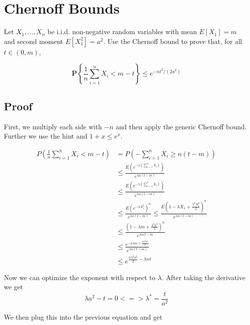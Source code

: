 \documentclass[a4paper, 11pt]{article} %
\begin{document}
\newpage

\section{Chernoff Bounds}
Let $X_1, . . . , X_n$ be i.i.d. non-negative random variables with mean $E[X_1] = m$ and
second moment $E[X_1^2] = a^2$. Use the Chernoff bound to prove that, for all $t \in (0, m)$,

\begin{equation*}
\mathbf { P } \left\{ \frac { 1 } { n } \sum _ { i = 1 } ^ { n } X _ { i } < m - t \right\} \leq e ^ { - n t ^ { 2 } / \left( 2 a ^ { 2 } \right) }
\end{equation*}

\subsection{Proof}

First, we multiply each side with $-n$ and then apply the generic Chernoff bound. Further we use the hint and $1+x \leq e^x$.

\begin{align*}
P \left( \frac { 1 } { n } \sum _ { i = 1 } ^ { n } X _ { i } < m - t \right) &= P \left( - \sum _ { i = 1 } ^ { n } X _ { i } \geq n ( t - m ) \right) \\
&\leq \frac{E \left( e ^{-\lambda \left(\sum_{i=1}^n X_i \right) } \right)}{e^{\lambda n(t-m)}} \\
&\leq \frac{E \left( e ^{-\lambda \left(\sum_{i=1}^n X_i \right) } \right)}{e^{\lambda n(t-m)}} \\
&\leq \frac{E \left( e ^{-\lambda X_1^2 } \right)^n}{e^{\lambda n(t-m)}} 
\leq  \frac{E \left( 1 - \lambda X_1 + \frac{\lambda^2 X_i^2}{2}   \right)^n}{e^{\lambda n(t-m)}} \\
&\leq \frac{ \left(1 - \lambda m + \frac{\lambda^2 a^2}{2} \right)^n  }{e^{\lambda n(t-m}} \\
&\leq \frac{e^{- n\lambda m + \frac{n\lambda^2 a^2}{2} }}{e^{\lambda n(t-m)}} \\
&\leq e^{\frac{n \lambda^2 a^2}{2}- \lambda n t }
\end{align*}

Now we can optimize the exponent with respect to $\lambda$. After taking the derivative we get
\begin{equation*}
\lambda a^2 -t = 0 <=> \lambda^* = \frac{t}{a^2}
\end{equation*}

We then plug this into the previous equation and get 
\end{document}
